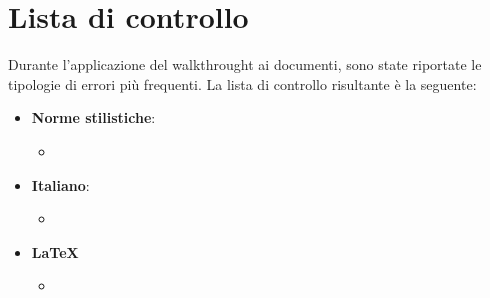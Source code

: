 \chapter{Lista di controllo}
Durante l'applicazione del walkthrought ai documenti, sono state riportate le tipologie di errori più frequenti. La lista di controllo risultante è la seguente:
\begin{itemize}
	\item \textbf{Norme stilistiche}:
	\begin{itemize}
		\item
	\end{itemize}
	\item \textbf{Italiano}:
	\begin{itemize}
		\item 
	\end{itemize}
	\item \textbf{\LaTeX}
	\begin{itemize}
		\item
	\end{itemize}
\end{itemize}